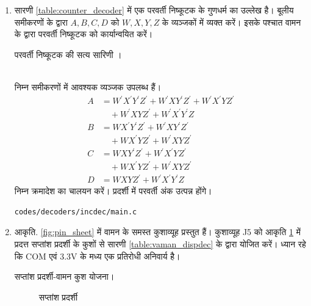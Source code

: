 \documentclass[journal,12pt,twocolumn]{IEEEtran}
\renewcommand\thesection{\arabic{section}}
\begin{document}
\begin{enumerate}[label=\thesection.\arabic*.,ref=\thesection.\theenumi]
\item सारणी \ref{table:counter_decoder} में एक परवर्ती निष्कूटक के गुणधर्म का उल्लेख है।  बूलीय समीकरणों के द्वारा $A,B,C,D$ को $W,X,Y,Z$ के व्यञ्जकों में व्यक्त करें।  इसके पश्चात वामन के द्वारा परवर्ती निष्कूटक को कार्यान्वयित करें। 
\label{prob:counter_decoder}
\begin{table}
\centering

\caption{परवर्ती निष्कूटक की सत्य सारिणी ।}
\label{table:counter_decoder}
\end{table}
\\
\solution निम्न समीकरणों में आवश्यक व्यञ्जक उपलब्ध हैं।
\begin{align}
\label{eq:inc_A}
A &= W^{\prime}X^{\prime}Y^{\prime}Z^{\prime} + W^{\prime}XY^{\prime}Z^{\prime}
+W^{\prime}X^{\prime}YZ^{\prime}
\nonumber \\
 & \quad +W^{\prime}XYZ^{\prime}
+W^{\prime}X^{\prime}Y^{\prime}Z
\\
\label{eq:inc_B}
B &= WX^{\prime}Y^{\prime}Z^{\prime} + W^{\prime}XY^{\prime}Z^{\prime}
\nonumber \\ 
& \quad 
+WX^{\prime}YZ^{\prime}
+W^{\prime}XYZ^{\prime}
\\
\label{eq:inc_C}
C &= WXY^{\prime}Z^{\prime} + W^{\prime}X^{\prime}YZ^{\prime}
\nonumber \\ 
& \quad 
+WX^{\prime}YZ^{\prime}
+W^{\prime}XYZ^{\prime}
\\
D &= WXYZ^{\prime} + W^{\prime}X^{\prime}Y^{\prime}Z
\label{eq:inc_D}
\end{align}
निम्न क्रमादेश का चालयन करें। प्रदर्शी में परवर्ती अंक उत्पन्न होंगे।
\begin{lstlisting}
codes/decoders/incdec/main.c
\end{lstlisting}
%
\item आकृति. \ref{fig:pin_sheet} में  वामन के समस्त कुशाव्यूह  प्रस्तुत हैं।  कुशाव्यूह J5 को  आकृति \ref{fig:sevenseg} में प्रदत्त सप्तांश प्रदर्शी के कुशों से सारणी \ref{table:vaman_dispdec} के द्वारा योजित करें। ध्यान  रहे कि COM एवं 3.3V के मध्य एक प्रतिरोधी अनिवार्य है। 
\begin{table}[!ht]
\centering
\parbox{.45\columnwidth}{

}
\hfill
\parbox{.45\columnwidth}{

}
\caption{सप्तांश प्रदर्शी-वामन कुश योजना।}
\label{table:vaman_dispdec}
\end{table}

\begin{figure}[!ht]
\centering
\resizebox{\columnwidth}{!}{

}
\caption{सप्तांश प्रदर्शी}
\label{fig:sevenseg}
\end{figure}



\end{enumerate}
\end{document}
